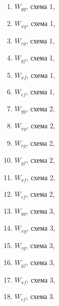 \documentclass[a4paper,oneside,10pt]{book}
\theoremstyle{definition}
\begin{document}
\begin{multicols}{3}

	
	\begin{enumerate}
		\item $W_{yg}$, схема 1,
		\item $W_{xg}$, схема 1,
		\item $W_{eg}$, схема 1,
		\item $W_{yf}$, схема 1,
		\item $W_{xf}$, схема 1,
		\item $W_{ef}$, схема 1,
		
		\item $W_{yg}$, схема 2, 
		\item $W_{xg}$, схема 2,
		\item $W_{eg}$, схема 2,
		\item $W_{yf}$, схема 2,
		\item $W_{xf}$, схема 2,
		\item $W_{ef}$, схема 2,
		
		\item $W_{yg}$, схема 3, 
		\item $W_{xg}$, схема 3,
		\item $W_{eg}$, схема 3,
		\item $W_{yf}$, схема 3,
		\item $W_{xf}$, схема 3,
		\item $W_{ef}$, схема 3.
		

		
		
		
	\end{enumerate}
\end{multicols}
\end{document}
